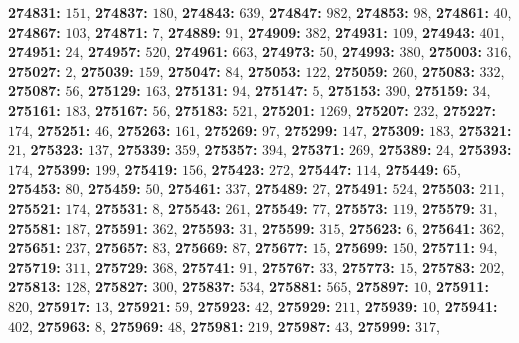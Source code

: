 \textsf{\bfseries 274831:} $151$, \textsf{\bfseries 274837:} $180$, \textsf{\bfseries 274843:} $639$, \textsf{\bfseries 274847:} $982$, \textsf{\bfseries 274853:} $98$, \textsf{\bfseries 274861:} $40$, \textsf{\bfseries 274867:} $103$, \textsf{\bfseries 274871:} $7$, \textsf{\bfseries 274889:} $91$, \textsf{\bfseries 274909:} $382$, \textsf{\bfseries 274931:} $109$, \textsf{\bfseries 274943:} $401$, \textsf{\bfseries 274951:} $24$, \textsf{\bfseries 274957:} $520$, \textsf{\bfseries 274961:} $663$, \textsf{\bfseries 274973:} $50$, \textsf{\bfseries 274993:} $380$, \textsf{\bfseries 275003:} $316$, \textsf{\bfseries 275027:} $2$, \textsf{\bfseries 275039:} $159$, \textsf{\bfseries 275047:} $84$, \textsf{\bfseries 275053:} $122$, \textsf{\bfseries 275059:} $260$, \textsf{\bfseries 275083:} $332$, \textsf{\bfseries 275087:} $56$, \textsf{\bfseries 275129:} $163$, \textsf{\bfseries 275131:} $94$, \textsf{\bfseries 275147:} $5$, \textsf{\bfseries 275153:} $390$, \textsf{\bfseries 275159:} $34$, \textsf{\bfseries 275161:} $183$, \textsf{\bfseries 275167:} $56$, \textsf{\bfseries 275183:} $521$, \textsf{\bfseries 275201:} $1269$, \textsf{\bfseries 275207:} $232$, \textsf{\bfseries 275227:} $174$, \textsf{\bfseries 275251:} $46$, \textsf{\bfseries 275263:} $161$, \textsf{\bfseries 275269:} $97$, \textsf{\bfseries 275299:} $147$, \textsf{\bfseries 275309:} $183$, \textsf{\bfseries 275321:} $21$, \textsf{\bfseries 275323:} $137$, \textsf{\bfseries 275339:} $359$, \textsf{\bfseries 275357:} $394$, \textsf{\bfseries 275371:} $269$, \textsf{\bfseries 275389:} $24$, \textsf{\bfseries 275393:} $174$, \textsf{\bfseries 275399:} $199$, \textsf{\bfseries 275419:} $156$, \textsf{\bfseries 275423:} $272$, \textsf{\bfseries 275447:} $114$, \textsf{\bfseries 275449:} $65$, \textsf{\bfseries 275453:} $80$, \textsf{\bfseries 275459:} $50$, \textsf{\bfseries 275461:} $337$, \textsf{\bfseries 275489:} $27$, \textsf{\bfseries 275491:} $524$, \textsf{\bfseries 275503:} $211$, \textsf{\bfseries 275521:} $174$, \textsf{\bfseries 275531:} $8$, \textsf{\bfseries 275543:} $261$, \textsf{\bfseries 275549:} $77$, \textsf{\bfseries 275573:} $119$, \textsf{\bfseries 275579:} $31$, \textsf{\bfseries 275581:} $187$, \textsf{\bfseries 275591:} $362$, \textsf{\bfseries 275593:} $31$, \textsf{\bfseries 275599:} $315$, \textsf{\bfseries 275623:} $6$, \textsf{\bfseries 275641:} $362$, \textsf{\bfseries 275651:} $237$, \textsf{\bfseries 275657:} $83$, \textsf{\bfseries 275669:} $87$, \textsf{\bfseries 275677:} $15$, \textsf{\bfseries 275699:} $150$, \textsf{\bfseries 275711:} $94$, \textsf{\bfseries 275719:} $311$, \textsf{\bfseries 275729:} $368$, \textsf{\bfseries 275741:} $91$, \textsf{\bfseries 275767:} $33$, \textsf{\bfseries 275773:} $15$, \textsf{\bfseries 275783:} $202$, \textsf{\bfseries 275813:} $128$, \textsf{\bfseries 275827:} $300$, \textsf{\bfseries 275837:} $534$, \textsf{\bfseries 275881:} $565$, \textsf{\bfseries 275897:} $10$, \textsf{\bfseries 275911:} $820$, \textsf{\bfseries 275917:} $13$, \textsf{\bfseries 275921:} $59$, \textsf{\bfseries 275923:} $42$, \textsf{\bfseries 275929:} $211$, \textsf{\bfseries 275939:} $10$, \textsf{\bfseries 275941:} $402$, \textsf{\bfseries 275963:} $8$, \textsf{\bfseries 275969:} $48$, \textsf{\bfseries 275981:} $219$, \textsf{\bfseries 275987:} $43$, \textsf{\bfseries 275999:} $317$, 
